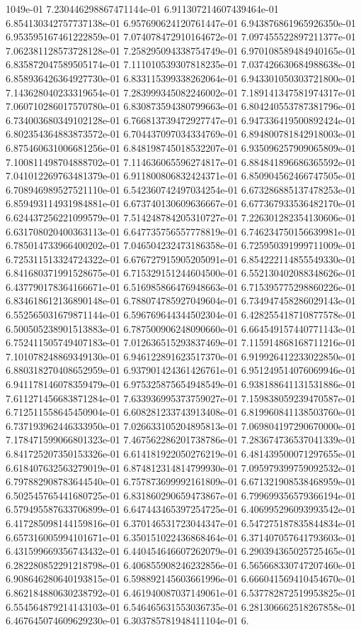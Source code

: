1049e-01	7.230446298867471144e-01	6.911307214607439464e-01	6.854130342757737138e-01	6.957690624120761447e-01	6.943876861965926350e-01	6.953595167461222859e-01	7.074078472910164672e-01	7.097455522897211377e-01	7.062381128573728128e-01	7.258295094338754749e-01	6.970108589484940165e-01	6.835872047589505174e-01	7.111010539307818235e-01	7.037426630684988638e-01	6.858936426364927730e-01	6.833115399338262064e-01	6.943301050303721800e-01	7.143628040233319654e-01	7.283999345082246002e-01	7.189141347581974317e-01	7.060710286017570780e-01	6.830873594380799663e-01	6.804240553787381796e-01	6.734003680349102128e-01	6.766813739472927747e-01	6.947336419500892424e-01	6.802354364883873572e-01	6.704437097034334769e-01	6.894800781842918003e-01	6.875460631006681256e-01	6.848198745018532207e-01	6.935096257909065809e-01	7.100811498704888702e-01	7.114636065596274817e-01	6.884841896686365592e-01	7.041012269763481379e-01	6.911800806832424371e-01	6.850904562466747505e-01	6.708946989527521110e-01	6.542360742497034254e-01	6.673286885137478253e-01	6.859493114931984881e-01	6.673740130609636667e-01	6.677367933536482170e-01	6.624437256221099579e-01	7.514248784205310727e-01	7.226301282354130606e-01	6.631708020400363113e-01	6.647735756557778819e-01	6.746234750156639981e-01	6.785014733966400202e-01	7.046504232473186358e-01	6.725950391999711009e-01	6.725311513324724322e-01	6.676727915905205091e-01	6.854222114855549330e-01	6.841680371991528675e-01	6.715329151244604500e-01	6.552130402088348626e-01	6.437790178364166671e-01	6.516985866476948663e-01	6.715395775298860226e-01	6.834618612136890148e-01	6.788074785927049604e-01	6.734947458286029143e-01	6.552565031679871144e-01	6.596769644344502304e-01	6.428255418710877578e-01	6.500505238901513883e-01	6.787500906248090660e-01	6.664549157440771143e-01	6.752411505749407183e-01	7.012636515293837469e-01	7.115914868168711216e-01	7.101078248869349130e-01	6.946122891623517370e-01	6.919926412233022850e-01	6.880318270408652959e-01	6.937901424361426761e-01	6.951249514076069946e-01	6.941178146078359479e-01	6.975325875654948549e-01	6.938188641131531886e-01	7.611271456683871284e-01	7.633936995373759027e-01	7.159838059239470587e-01	6.712511558645450904e-01	6.608281233743913408e-01	6.819960841138503760e-01	6.737193962446333950e-01	7.026633105204895813e-01	7.069804197290670000e-01	7.178471599066801323e-01	7.467562286201738786e-01	7.283674736537041339e-01	6.841725207350153326e-01	6.614181922050276219e-01	6.481439500071297655e-01	6.618407632563279019e-01	6.874812314814799930e-01	7.095979399759092532e-01	6.797882908783644540e-01	6.757873699992161809e-01	6.671321908538468959e-01	6.502545765441680725e-01	6.831860290659473867e-01	6.799699356579366194e-01	6.579495587633706899e-01	6.647443465397254725e-01	6.406995296093993542e-01	6.417285098144159816e-01	6.370146531723044347e-01	6.547275187835844834e-01	6.657316005994101671e-01	6.350151022436868464e-01	6.371407057641793603e-01	6.431599669356743432e-01	6.440454646607262079e-01	6.290394365025725465e-01	6.282280852291218798e-01	6.406855908246232856e-01	6.565668330747207460e-01	6.908646280640193815e-01	6.598892145603661996e-01	6.666041569410454670e-01	6.862184880630238792e-01	6.461940087037149061e-01	6.537782872519953825e-01	6.554564879214143103e-01	6.546465631553036735e-01	6.281306662518267858e-01	6.467645074609629230e-01	6.303785781948411104e-01	6.
